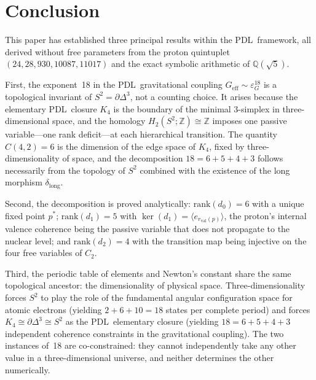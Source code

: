 \documentclass[11pt,a4paper]{article}
\theoremstyle{definition}
\newcommand{\PDL}{\textnormal{PDL}}
\newcommand{\rval}{r_{\mathrm{val}}}
\newcommand{\epsg}{\varepsilon_G}
\newcommand{\Kfour}{K_4}
\newcommand{\rank}{\mathrm{rank}}
\newcommand{\dmap}[1]{d_{#1}}
\newcommand{\dlong}{\delta_{\mathrm{long}}}
\begin{document}
\section*{Conclusion}

This paper has established three principal results within the \PDL\ framework, all derived without free parameters from the proton quintuplet $(24, 28, 930, 10087, 11017)$ and the exact symbolic arithmetic of $\mathbb{Q}(\sqrt{5})$.

First, the exponent~18 in the \PDL\ gravitational coupling $G_{\mathrm{eff}} \sim \epsg^{18}$ is a topological invariant of $S^2 = \partial\Delta^3$, not a counting choice. It arises because the elementary \PDL\ closure $\Kfour$ is the boundary of the minimal $3$-simplex in three-dimensional space, and the homology $H_2(S^2;\mathbb{Z}) \cong \mathbb{Z}$ imposes one passive variable---one rank deficit---at each hierarchical transition. The quantity $C(4,2) = 6$ is the dimension of the edge space of $\Kfour$, fixed by three-dimensionality of space, and the decomposition $18 = 6+5+4+3$ follows necessarily from the topology of $S^2$ combined with the existence of the long morphism $\dlong$.

Second, the decomposition is proved analytically: $\rank(\dmap{0}) = 6$ with a unique fixed point $p^*$; $\rank(\dmap{1}) = 5$ with $\ker(\dmap{1}) = \langle e_{\rval(p)}\rangle$, the proton's internal valence coherence being the passive variable that does not propagate to the nuclear level; and $\rank(\dmap{2}) = 4$ with the transition map being injective on the four free variables of $C_2$.

Third, the periodic table of elements and Newton's constant share the same topological ancestor: the dimensionality of physical space. Three-dimensionality forces $S^2$ to play the role of the fundamental angular configuration space for atomic electrons (yielding $2+6+10 = 18$ states per complete period) and forces $\Kfour \cong \partial\Delta^3 \cong S^2$ as the \PDL\ elementary closure (yielding $18 = 6+5+4+3$ independent coherence constraints in the gravitational coupling). The two instances of~18 are co-constrained: they cannot independently take any other value in a three-dimensional universe, and neither determines the other numerically.


\nocite{*}

\end{document}
